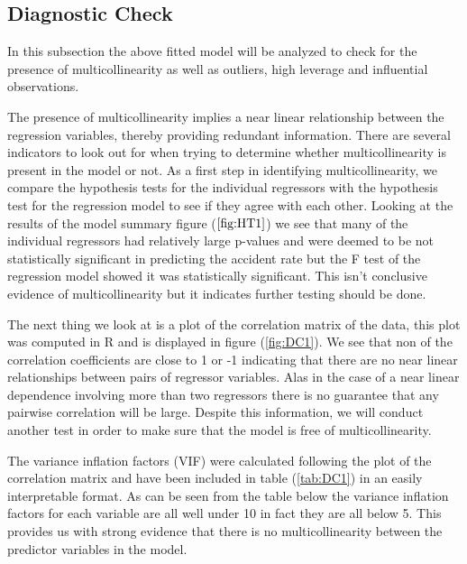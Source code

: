 \documentclass[12pt]{report}
\begin{document}
\subsection{Diagnostic Check}

In this subsection the above fitted model will be analyzed to check for the presence of multicollinearity as well as outliers, high leverage and influential observations. 

The presence of multicollinearity implies a near linear relationship between the regression variables, thereby providing redundant information. There are several indicators to look out for when trying to determine whether multicollinearity is present in the model or not. As a first step in identifying multicollinearity, we compare the hypothesis tests for the individual regressors with the hypothesis test for the regression model to see if they agree with each other. Looking at the results of the model summary figure ($\ref{fig:HT1}$) we see that many of the individual regressors had relatively large p-values and were deemed to be not statistically significant in predicting the accident rate but the F test of the regression model showed it was statistically significant. This isn't conclusive evidence of multicollinearity but it indicates further testing should be done. 

The next thing we look at is a plot of the correlation matrix of the data, this plot was computed in R and is displayed in figure (\ref{fig:DC1}). We see that non of the correlation coefficients are close to 1 or -1 indicating that there are no near linear relationships between pairs of regressor variables. Alas in the case of a near linear dependence involving more than two regressors there is no guarantee that any pairwise correlation will be large. Despite this information, we will conduct another test in order to make sure that the model is free of multicollinearity.

The variance inflation factors (VIF) were calculated following the plot of the correlation matrix and have been included in table (\ref{tab:DC1}) in an easily interpretable format. As can be seen from the table below the variance inflation factors for each variable are all well under 10 in fact they are all below 5. This provides us with strong evidence that there is no multicollinearity between the predictor variables in the model.
\end{document}
